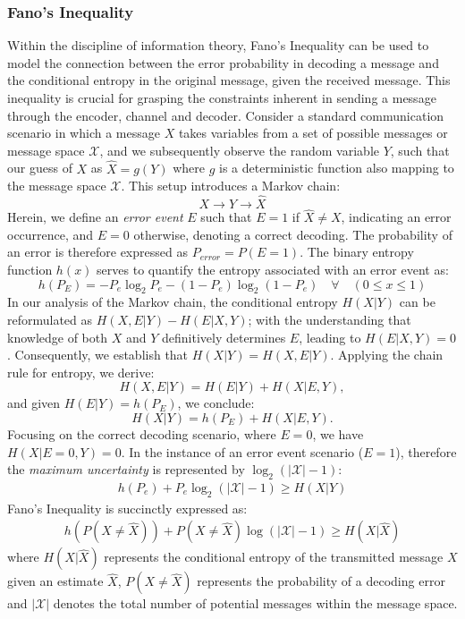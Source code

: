 \documentclass[journal,12pt,onecolumn,draftclsnofoot,]{IEEEtran}
\begin{document}
	\subsubsection{Fano's Inequality}
	Within the discipline of information theory, Fano's Inequality can be used to model the connection between the error probability in decoding a message and the conditional entropy in the original message, given the received message. This inequality is crucial for grasping the constraints inherent in sending a message through the encoder, channel and decoder. Consider a standard communication scenario in which a message \(X\) takes variables from a set of possible messages or message space \(\mathcal{X}\), and we subsequently observe the random variable \(Y\), such that our guess of \(X\) as \(\hat{X} = g(Y)\) where \(g\) is a deterministic function also mapping to the message space \(\mathcal{X}\). This setup introduces a Markov chain:
	\begin{equation}
		X \rightarrow Y \rightarrow \hat{X}
	\end{equation}
	Herein, we define an \emph{error event} \(E\) such that \(E = 1\) if \(\hat{X} \neq X\), indicating an error occurrence, and \(E = 0\) otherwise, denoting a correct decoding. The probability of an error is therefore expressed as \(P_{error} = P(E = 1)\). The binary entropy function \(h(x)\) serves to quantify the entropy associated with an error event as:
	\begin{equation}
		h(P_E) = -P_e \log_2 P_e - (1 - P_e) \log_2 (1 - P_e) \quad \forall \quad (0 \leq x \leq 1)
	\end{equation}
	In our analysis of the Markov chain, the conditional entropy \(H(X|Y)\) can be reformulated as \(H(X, E|Y) - H(E|X, Y)\); with the understanding that knowledge of both \(X\) and \(Y\) definitively determines \(E\), leading to \(H(E|X, Y) = 0\). Consequently, we establish that \(H(X|Y) = H(X, E|Y)\). Applying the chain rule for entropy, we derive:
	\begin{equation}
		H(X, E|Y) = H(E|Y) + H(X|E, Y),
	\end{equation}
	and given \(H(E|Y) = h(P_E)\), we conclude:
	\begin{equation}
		H(X|Y) = h(P_E) + H(X|E, Y).
	\end{equation}
	Focusing on the correct decoding scenario, where \(E = 0\), we have \(H(X|E=0, Y) = 0\). In the instance of an error event scenario (\(E = 1\)), therefore the \emph{maximum uncertainty} is represented by \(\log_2 (|\mathcal{X}| - 1)\):
	\begin{align*}
		h(P_e) + P_e \log_2 (|\mathcal{X}| - 1)  \geq H(X|Y)  
	\end{align*}
	Fano's Inequality is succinctly expressed as:
	\begin{align*}
		h(P(X \neq \hat{X})) + P(X \neq \hat{X}) \log (|\mathcal{X}| - 1)  \geq H(X | \hat{X})
	\end{align*}
	where \(H(X|\hat{X})\) represents the conditional entropy of the transmitted message \(X\) given an estimate \(\hat{X}\), \(P(X \neq \hat{X})\) represents the probability of a decoding error and \(|\mathcal{X}|\) denotes the total number of potential messages within the message space.

	\newpage
	
	
\end{document}
